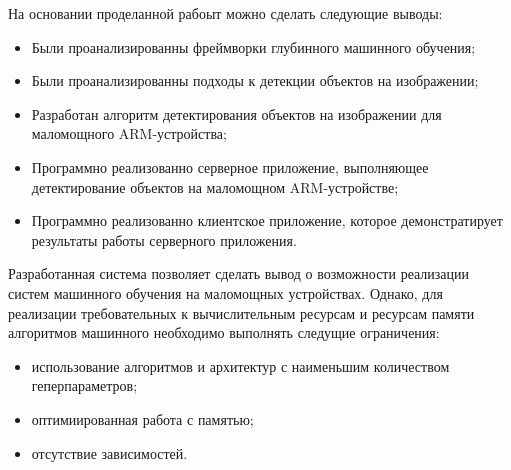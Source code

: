 \documentclass[a4paper,english,russian]{G2-105}
\begin{document}
\newpage
{}
\par На основании проделанной рабоыт можно сделать следующие выводы:
\begin{itemize}
\item Были проанализированны фреймворки глубинного машинного обучения;
\item Были проанализированны подходы к детекции объектов на изображении;
\item Разработан алгоритм детектирования объектов на изображении для маломощного ARM-устройства;
\item Программно реализованно серверное приложение, выполняющее детектирование объектов на маломощном ARM-устройстве;
\item Программно реализованно клиентское приложение, которое демонстратирует результаты работы серверного приложения.
\end{itemize}
\par Разработанная система позволяет сделать вывод о возможности реализации систем машинного обучения на маломощных устройствах. Однако, для реализации требовательных к вычислительным ресурсам и ресурсам памяти алгоритмов машинного необходимо выполнять следущие ограничения:
\begin{itemize}
\item использование алгоритмов и архитектур с наименьшим количеством геперпараметров;
\item оптимиированная работа с памятью;
\item отсутствие зависимостей.
\end{itemize}
\newpage
\end{document}
